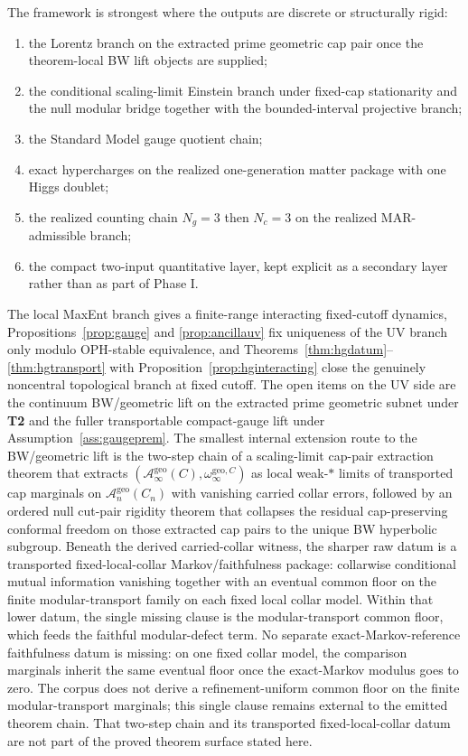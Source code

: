 \documentclass[11pt]{article}
\begin{document}
The framework is strongest where the outputs are discrete or structurally rigid:
\begin{enumerate}[leftmargin=2em]
\item the Lorentz branch on the extracted prime geometric cap pair once the theorem-local BW lift objects are supplied;
\item the conditional scaling-limit Einstein branch under fixed-cap stationarity and the null modular bridge together with the bounded-interval projective branch;
\item the Standard Model gauge quotient chain;
\item exact hypercharges on the realized one-generation matter package with one Higgs doublet;
\item the realized counting chain \(N_g=3\) then \(N_c=3\) on the realized MAR-admissible branch;
\item the compact two-input quantitative layer, kept explicit as a secondary layer rather than as part of Phase I.
\end{enumerate}

The local MaxEnt branch gives a finite-range interacting fixed-cutoff dynamics, Propositions~\ref{prop:gauge} and \ref{prop:ancillauv} fix uniqueness of the UV branch only modulo OPH-stable equivalence, and Theorems~\ref{thm:hgdatum}--\ref{thm:hgtransport} with Proposition~\ref{prop:hginteracting} close the genuinely noncentral topological branch at fixed cutoff. The open items on the UV side are the continuum BW/geometric lift on the extracted prime geometric subnet under \textbf{T2} and the fuller transportable compact-gauge lift under Assumption~\ref{ass:gaugeprem}. The smallest internal extension route to the BW/geometric lift is the two-step chain of a scaling-limit cap-pair extraction theorem that extracts \((\mathcal A_\infty^{\mathrm{geo}}(C),\omega_\infty^{\mathrm{geo},C})\) as local weak-\(*\) limits of transported cap marginals on \(\mathcal A_n^{\mathrm{geo}}(C_n)\) with vanishing carried collar errors, followed by an ordered null cut-pair rigidity theorem that collapses the residual cap-preserving conformal freedom on those extracted cap pairs to the unique BW hyperbolic subgroup. Beneath the derived carried-collar witness, the sharper raw datum is a transported fixed-local-collar Markov/faithfulness package: collarwise conditional mutual information vanishing together with an eventual common floor on the finite modular-transport family on each fixed local collar model. Within that lower datum, the single missing clause is the modular-transport common floor, which feeds the faithful modular-defect term. No separate exact-Markov-reference faithfulness datum is missing: on one fixed collar model, the comparison marginals inherit the same eventual floor once the exact-Markov modulus goes to zero. The corpus does not derive a refinement-uniform common floor on the finite modular-transport marginals; this single clause remains external to the emitted theorem chain. That two-step chain and its transported fixed-local-collar datum are not part of the proved theorem surface stated here.
\end{document}
